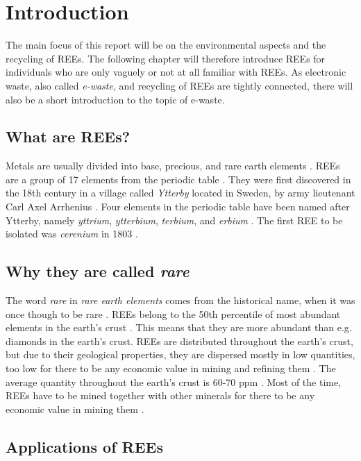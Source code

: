 
\section{Introduction}
The main focus of this report will be on the environmental aspects and the recycling of REEs. The following chapter will therefore introduce REEs for individuals who are only vaguely or not at all familiar with REEs. As electronic waste, also called \textit{e-waste}, and recycling of REEs are tightly connected, there will also be a short introduction to the topic of e-waste. 

\subsection{What are REEs?}

Metals are usually divided into base, precious, and rare earth elements \cite{javed2024}. REEs are a group of 17 elements from the periodic table \cite{USDoE2024}. They were first discovered in the 18th century in a village called \textit{Ytterby} located in Sweden, by army lieutenant Carl Axel Arrhenius \cite{britannica2024}. Four elements in the periodic table have been named after Ytterby, namely \textit{yttrium}, \textit{ytterbium}, \textit{terbium}, and \textit{erbium} \cite{sciencehistory2024}. The first REE to be isolated was \textit{cerenium} in 1803 \cite{britannica2024}.  

\subsection{Why they are called \textit{rare}}

The word \textit{rare} in \textit{rare earth elements} comes from the historical name, when it was once though to be rare \cite{sciencehistory2024}. REEs belong to the 50th percentile of most abundant elements in the earth's crust \cite{britannica2024}. This means that they are more abundant than e.g. diamonds \cite{diamonds} in the earth's crust. REEs are distributed throughout the earth's crust, but due to their geological properties, they are dispersed mostly in low quantities, too low for there to be any economic value in mining and refining them \cite{REEDistribution}. The average quantity throughout the earth's crust is 60-70 ppm \cite{REEDistribution}. Most of the time, REEs have to be mined together with other minerals for there to be any economic value in mining them \cite{REEDistribution}. 

\subsection{Applications of REEs}

